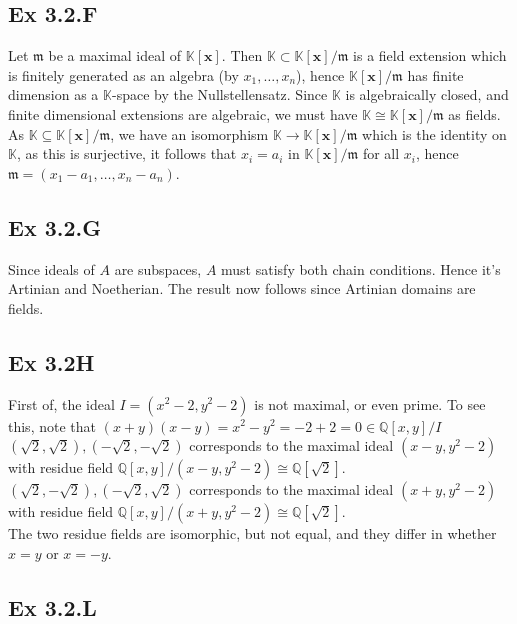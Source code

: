 \documentclass{article}
\theoremstyle{definition}
\newcommand{\Q}{\mathbb{Q}}
\newcommand{\K}{\mathbb{K}}
\newcommand{\Kx}{\K[\bm{x}]}
\begin{document}
\subsection*{Ex 3.2.F}

Let $\mathfrak{m}$ be a maximal ideal of $\Kx$. Then $\K \subset
\Kx/\mathfrak{m}$ is a field extension which is finitely generated as an
algebra (by $x_1, \ldots, x_n$), hence $\Kx/\mathfrak{m}$ has finite dimension
as a $\K$-space by the Nullstellensatz. Since $\K$ is algebraically closed, and
finite dimensional extensions are algebraic, we must have $\K \cong
\Kx/\mathfrak{m}$ as fields. As $\K \subseteq \Kx/\mathfrak{m}$, we have an
isomorphism $\K \to \Kx/\mathfrak{m}$ which is the identity on $\K$, as this is
surjective, it follows that $x_i = a_i$ in $\Kx/\mathfrak{m}$ for all $x_i$,
hence $\mathfrak{m} = (x_1 - a_1, \ldots, x_n - a_n)$.

\subsection*{Ex 3.2.G}

Since ideals of $A$ are subspaces, $A$ must satisfy both chain conditions.
Hence it's Artinian and Noetherian. The result now follows since Artinian
domains are fields.

\subsection*{Ex 3.2H}

First of, the ideal $I = (x^2 - 2, y^2 - 2)$ is not maximal, or even prime. To
see this, note that $(x + y)(x - y) = x^2 - y^2 = -2 + 2 = 0 \in \Q[x, y] / I$
\\

$(\sqrt{2}, \sqrt{2}), (-\sqrt{2}, -\sqrt{2})$ corresponds to the maximal ideal
$(x - y, y^2 - 2)$ with residue field $\Q[x, y]/(x - y, y^2 - 2) \cong
\Q[\sqrt{2}]$. \\

$(\sqrt{2}, -\sqrt{2}), (-\sqrt{2}, \sqrt{2})$ corresponds to the maximal ideal
$(x + y, y^2 - 2)$ with residue field $\Q[x, y]/(x + y, y^2 - 2) \cong
\Q[\sqrt{2}]$. \\

The two residue fields are isomorphic, but not equal, and they differ in
whether $x = y$ or $x = -y$.

\subsection*{Ex 3.2.L}
\end{document}
